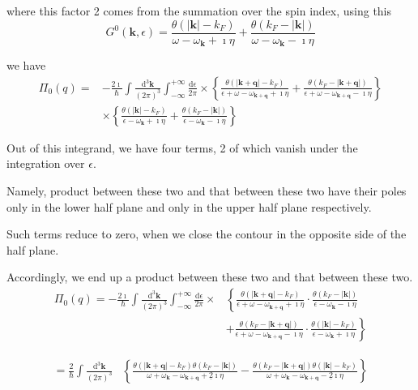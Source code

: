 where this factor 2 comes from the summation over the spin index, using this
\begin{equation} \label{Eqs2.8.13}
G^0(\mathbf{k},\epsilon) = \frac{\theta(|\mathbf{k}|-k_F)}{\omega-\omega_{\mathbf{k}}+\imath \eta} + \frac{\theta(k_F - |\mathbf{k}|)}{\omega-\omega_{\mathbf{k}}-\imath \eta}
\end{equation}

we have
\[\begin{split}\Pi_0(q) =&- \frac{2\imath}{\hbar} \int \frac{\mathrm{d}^3 \mathbf{k}}{(2\pi)^3} \int_{-\infty}^{+\infty} \frac{\mathrm{d} \epsilon}{2\pi} \times \left\{ \frac{\theta(|\mathbf{k}+\mathbf{q}|-k_F)}{\epsilon+\omega-\omega_{\mathbf{k}+\mathbf{q}} +\imath \eta} + \frac{\theta(k_F - |\mathbf{k}+\mathbf{q}|)}{\epsilon + \omega - \omega_{\mathbf{k}+\mathbf{q}}-\imath \eta} \right\}\\
&\times \left\{ \frac{\theta(|\mathbf{k}|-k_F)}{\epsilon-\omega_{\mathbf{k}} +\imath \eta} + \frac{\theta(k_F - |\mathbf{k}|)}{\epsilon - \omega_{\mathbf{k}}-\imath \eta} \right\} \end{split}\]

Out of this integrand, we have four terms, 2 of which vanish under the integration over $\epsilon$.

Namely, product between these two and that between these two have their poles only in the lower half plane and only in the upper half plane respectively.

Such terms reduce to zero, when we close the contour in the opposite side of the half plane.

Accordingly, we end up a product between these two and that between these two.\[\begin{split}\Pi_0(q) =- \frac{2\imath}{\hbar} \int \frac{\mathrm{d}^3 \mathbf{k}}{(2\pi)^3} \int_{-\infty}^{+\infty} \frac{\mathrm{d} \epsilon}{2\pi} \times &\left\{  \frac{\theta(|\mathbf{k}+\mathbf{q}|-k_F)}{\epsilon+\omega-\omega_{\mathbf{k}+\mathbf{q}} +\imath \eta} \cdot \frac{\theta(k_F - |\mathbf{k}|)}{\epsilon - \omega_{\mathbf{k}}-\imath \eta} \right.\\
&\left.+ \frac{\theta(k_F - |\mathbf{k}+\mathbf{q}|)}{\epsilon + \omega - \omega_{\mathbf{k}+\mathbf{q}}-\imath \eta} \cdot \frac{\theta(|\mathbf{k}|-k_F)}{\epsilon-\omega_{\mathbf{k}} +\imath \eta} \right\} 
 \end{split}\]

\[\begin{split}=\frac{2}{\hbar} \int \frac{\mathrm{d}^3 \mathbf{k}}{(2\pi)^3}
 &\left\{  \frac{\theta(|\mathbf{k}+\mathbf{q}|-k_F)\theta(k_F - |\mathbf{k}|)}{\omega + \omega_{\mathbf{k}}- \omega_{\mathbf{k}+\mathbf{q}} +\underline{2}\imath \eta} - \frac{\theta(k_F - |\mathbf{k}+\mathbf{q}|) \theta(|\mathbf{k}|-k_F)}{\omega + \omega_{\mathbf{k}} - \omega_{\mathbf{k}+\mathbf{q}}-\underline{2}\imath \eta} \right\} 
 \end{split}\]

